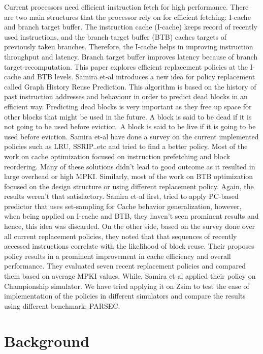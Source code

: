 \documentclass[11pt]{article}
\begin{document}
Current processors need efficient instruction fetch for high performance. There are two main structures that the processor rely on for efficient fetching: I-cache and branch
target buffer. The instruction cache (I-cache) keeps record of recently used instructions, and the branch target buffer (BTB) caches targets of previously taken branches.
Therefore, the I-cache helps in improving instruction throughput and latency. Branch target buffer improves latency because of branch target-recomputation. This 
paper \cite{samira-ISCA18} explores efficient replacement policies at the I-cache and BTB levels. Samira et-al introduces a new idea for policy replacement called Graph History
Reuse Prediction. This algorithm is based on the history of past instruction addresses and behaviour in order to predict dead blocks in an efficient way. Predicting dead blocks
is very important as they free up space for other blocks that might be used in the future. A block is said to be dead if it is not going to be used before eviction. A block is 
said to be live if it is going to be used before eviction. Samira et-al have done a survey on the current implemented policies such as LRU, SSRIP..etc and tried to find a 
better policy. Most of the work on cache optimization focused on instruction prefetching and block reordering. Many of these solutions didn’t lead to good  outcome as it 
resulted in large overhead or high MPKI. Similarly, most of the work on BTB optimization focused on the design structure or using different replacement policy. Again, the 
results weren’t that satisfactory. 
Samira et-al first, tried to apply PC-based predictor that uses set-sampling for Cache behavior generalization, however, when being applied on I-cache and BTB, they haven’t 
seen prominent results and hence, this idea was discarded. On the other side,  based on the survey done over all current replacement policies, they noted that that sequences of
recently accessed instructions correlate with the likelihood of block reuse. Their proposes policy results in a prominent improvement in cache efficiency and overall 
performance. They evaluated seven recent replacement policies and compared them based on average MPKI values. While, Samira et al applied their policy on Championship 
simulator. We have tried applying it on Zsim to test the ease of implementation of the policies in different simulators and compare the results using different benchmark; 
PARSEC.


\section{Background}
\label{sec:background}
\end{document}
